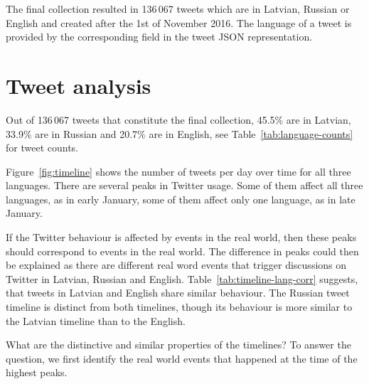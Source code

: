 \documentclass[11pt,a4paper]{article}
\begin{document}
The final collection resulted in 136\,067 tweets which are in Latvian, Russian or English and created after the 1st of November 2016. The language of a tweet is provided by the corresponding field in the tweet JSON representation.

\section{Tweet analysis}
\label{sec:timeline}



Out of 136\,067 tweets that constitute the final collection, 45.5\% are in Latvian, 33.9\% are in Russian and 20.7\% are in English, see Table~\ref{tab:language-counts} for tweet counts.



Figure~\ref{fig:timeline} shows the number of tweets per day over time for all three languages. There are several peaks in Twitter usage. Some of them affect all three languages, as in early January, some of them affect only one language, as in late January.

If the Twitter behaviour is affected by events in the real world, then these peaks should correspond to events in the real world. The difference in peaks could then be explained as there are different real word events that trigger discussions on Twitter in Latvian, Russian and English. Table~\ref{tab:timeline-lang-corr} suggests, that tweets in Latvian and English share similar behaviour. The Russian tweet timeline is distinct from both timelines, though its behaviour is more similar to the Latvian timeline than to the English.


What are the distinctive and similar properties of the timelines? To answer the question, we first identify the real world events that happened at the time of the highest peaks.
\end{document}
